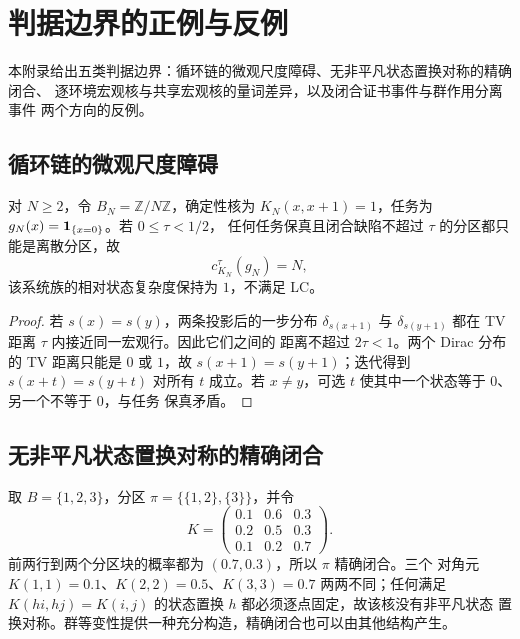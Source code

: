 \section{判据边界的正例与反例}
\label{app:examples-counterexamples}

本附录给出五类判据边界：循环链的微观尺度障碍、无非平凡状态置换对称的精确闭合、
逐环境宏观核与共享宏观核的量词差异，以及闭合证书事件与群作用分离事件
两个方向的反例。

\subsection{循环链的微观尺度障碍}

\begin{counterexample}[循环链]
\label{counter:cycle}
对 $N\ge2$，令 $B_N=\mathbb Z/N\mathbb Z$，确定性核为
$K_N(x,x+1)=1$，任务为 $g_N(x)=\mathbf 1_{\{x=0\}}$。若 $0\le\tau<1/2$，
任何任务保真且闭合缺陷不超过 $\tau$ 的分区都只能是离散分区，故
\[
c_{K_N}^{\tau}(g_N)=N,
\]
该系统族的相对状态复杂度保持为 $1$，不满足 LC。
\end{counterexample}

\begin{proof}
若 $s(x)=s(y)$，两条投影后的一步分布 $\delta_{s(x+1)}$ 与
$\delta_{s(y+1)}$ 都在 TV 距离 $\tau$ 内接近同一宏观行。因此它们之间的
距离不超过 $2\tau<1$。两个 Dirac 分布的 TV 距离只能是 $0$ 或 $1$，故
$s(x+1)=s(y+1)$；迭代得到 $s(x+t)=s(y+t)$ 对所有 $t$ 成立。若
$x\ne y$，可选 $t$ 使其中一个状态等于 $0$、另一个不等于 $0$，与任务
保真矛盾。
\end{proof}

\subsection{无非平凡状态置换对称的精确闭合}

\begin{example}[无非平凡状态置换对称的闭合商]
\label{ex:closure-without-symmetry}
取 $B=\{1,2,3\}$，分区 $\pi=\{\{1,2\},\{3\}\}$，并令
\[
K=\begin{pmatrix}
0.1&0.6&0.3\\
0.2&0.5&0.3\\
0.1&0.2&0.7
\end{pmatrix}.
\]
前两行到两个分区块的概率都为 $(0.7,0.3)$，所以 $\pi$ 精确闭合。三个
对角元 $K(1,1)=0.1$、$K(2,2)=0.5$、$K(3,3)=0.7$ 两两不同；任何满足
$K(hi,hj)=K(i,j)$ 的状态置换 $h$ 都必须逐点固定，故该核没有非平凡状态
置换对称。群等变性提供一种充分构造，精确闭合也可以由其他结构产生。
\end{example}

